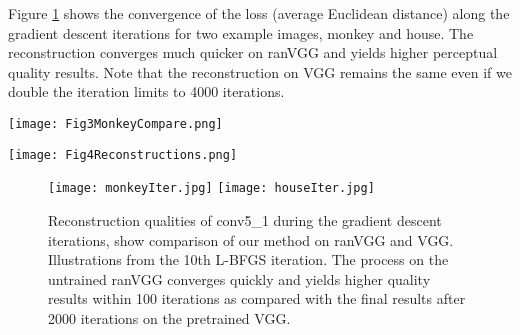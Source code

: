 \documentclass{article}
\begin{document}
Figure \ref{Fig:EdisIteration} shows the convergence of the loss (average Euclidean distance) along the gradient descent iterations for two example images, monkey and house.
The reconstruction converges much quicker on ranVGG and yields higher perceptual quality results. Note that the reconstruction on VGG remains the same even if we double the iteration limits to 4000 iterations.
\begin{figure*}[htbp]
    \centering
	\vspace{-0.5em}
	\texttt{[image: Fig3MonkeyCompare.png]}
	\vspace{-0.5em}
	\caption{\textbf{Reconstructions from layers of ranVGG (top) and the pretrained VGG (middle) and \cite{Mahendran2015CVPR} (bottom).} As AlexNet only contains 3 pooling layers, we compare their results on conv3 and conv4 with ours on pool3 and pool4. Our method on ranVGG demonstrates a higher perceptive quality, especially on the higher layers. Note that VGG is much deeper than AlexNet even when we compare on the same pooling layer.} %
	\label{fig:EdisCompareMonkey} %
\end{figure*}


\begin{figure*}[htbp]
    \centering
    \vspace{-2em}
    \texttt{[image: Fig4Reconstructions.png]}
	\vspace{-0.5em}
	\caption{\textbf{Reconstructions from different pooling layers of the untrained ranVGG and the pretrained VGG.}  ranVGG demonstrates a higher perceptive quality, especially on the higher layers. The pretrained VGG could rarely reconstruct even the contours from representations of the fifth pooling layer.} %
	\label{fig:EdisMultiPooling} %
\end{figure*}


\begin{figure}[htbp]
\centering
\texttt{[image: monkeyIter.jpg]}\hfill
\texttt{[image: houseIter.jpg]}
	\vspace{-0.5em}
\caption{Reconstruction qualities of conv5\_1 during the gradient descent iterations, show comparison of our method on ranVGG and VGG. Illustrations from the 10th L-BFGS iteration. The process on the untrained ranVGG converges quickly and yields higher quality results within 100 iterations as compared with the final results after 2000 iterations on the pretrained VGG.}
\label{Fig:EdisIteration}
\end{figure}
\end{document}
